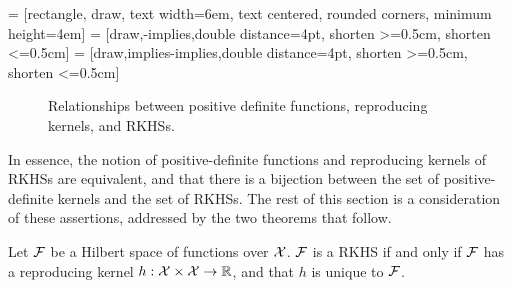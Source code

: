  = [rectangle, draw, text width=6em, text centered, rounded corners, minimum height=4em]
 = [draw,-implies,double distance=4pt, shorten >=0.5cm, shorten <=0.5cm]
 = [draw,implies-implies,double distance=4pt, shorten >=0.5cm, shorten <=0.5cm]

\vspace{0.5em}
\begin{figure}[H]
  \centering
  \caption{Relationships between positive definite functions, reproducing kernels, and RKHSs.}
\end{figure}
\vspace{-0.5em}

In essence, the notion of positive-definite functions and reproducing kernels of RKHSs are equivalent, and that there is a bijection between the set of positive-definite kernels and the set of RKHSs.
The rest of this section is a consideration of these assertions, addressed by the two theorems that follow.

\begin{theorem}\label{thm:rkhsunique}
  Let ${\mathcal F}$ be a Hilbert space of functions over ${\mathcal X}$.
  ${\mathcal F}$ is a RKHS if and only if ${\mathcal F}$ has a reproducing kernel $h:{\mathcal X}\times{\mathcal X}\to\mathbb{R}$, and that $h$ is unique to ${\mathcal F}$.
\end{theorem}

